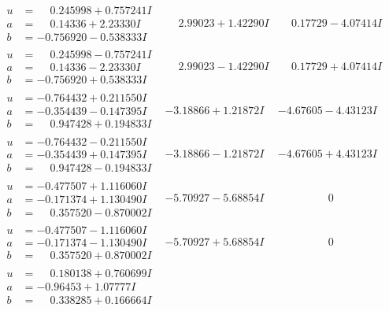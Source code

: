 \documentclass[1p]{elsarticle_modified}
\theoremstyle{definition}
\begin{document}
$$\begin{array}{c|c|c}
\begin{aligned}
u &= \phantom{-}0.245998 + 0.757241 I \\
a &= \phantom{-}0.14336 + 2.23330 I \\
b &= -0.756920 - 0.538333 I\end{aligned}
 & \phantom{-}2.99023 + 1.42290 I & \phantom{-}0.17729 - 4.07414 I \\ \hline\begin{aligned}
u &= \phantom{-}0.245998 - 0.757241 I \\
a &= \phantom{-}0.14336 - 2.23330 I \\
b &= -0.756920 + 0.538333 I\end{aligned}
 & \phantom{-}2.99023 - 1.42290 I & \phantom{-}0.17729 + 4.07414 I \\ \hline\begin{aligned}
u &= -0.764432 + 0.211550 I \\
a &= -0.354439 - 0.147395 I \\
b &= \phantom{-}0.947428 + 0.194833 I\end{aligned}
 & -3.18866 + 1.21872 I & -4.67605 - 4.43123 I \\ \hline\begin{aligned}
u &= -0.764432 - 0.211550 I \\
a &= -0.354439 + 0.147395 I \\
b &= \phantom{-}0.947428 - 0.194833 I\end{aligned}
 & -3.18866 - 1.21872 I & -4.67605 + 4.43123 I \\ \hline\begin{aligned}
u &= -0.477507 + 1.116060 I \\
a &= -0.171374 + 1.130490 I \\
b &= \phantom{-}0.357520 - 0.870002 I\end{aligned}
 & -5.70927 - 5.68854 I & \phantom{-0.000000 } 0 \\ \hline\begin{aligned}
u &= -0.477507 - 1.116060 I \\
a &= -0.171374 - 1.130490 I \\
b &= \phantom{-}0.357520 + 0.870002 I\end{aligned}
 & -5.70927 + 5.68854 I & \phantom{-0.000000 } 0 \\ \hline\begin{aligned}
u &= \phantom{-}0.180138 + 0.760699 I \\
a &= -0.96453 + 1.07777 I \\
b &= \phantom{-}0.338285 + 0.166664 I\end{aligned}

\end{array}$$
\end{document}
